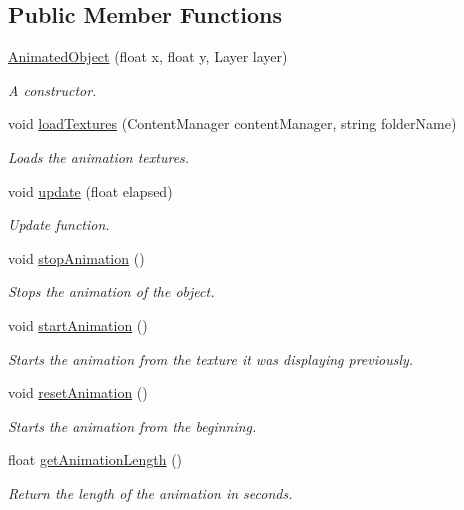 \subsection*{Public Member Functions}
\begin{DoxyCompactItemize}
\item 
\hyperlink{classwp__engine_1_1_animated_object_a43b6d15d770384cafc4546b447a63303}{Animated\-Object} (float x, float y, Layer layer)
\begin{DoxyCompactList}\small\item\em A constructor. \end{DoxyCompactList}\item 
void \hyperlink{classwp__engine_1_1_animated_object_a4d244865b8e26ffbbd9f9f8658ff9d6b}{load\-Textures} (Content\-Manager content\-Manager, string folder\-Name)
\begin{DoxyCompactList}\small\item\em Loads the animation textures. \end{DoxyCompactList}\item 
void \hyperlink{classwp__engine_1_1_animated_object_a5cf1995b0821dcb47fd878adcd996257}{update} (float elapsed)
\begin{DoxyCompactList}\small\item\em Update function. \end{DoxyCompactList}\item 
void \hyperlink{classwp__engine_1_1_animated_object_ab14a6e72ab2ff3a3c3ffbbfc2aa152f8}{stop\-Animation} ()
\begin{DoxyCompactList}\small\item\em Stops the animation of the object. \end{DoxyCompactList}\item 
void \hyperlink{classwp__engine_1_1_animated_object_af25e7e5021799779dae6a46c23458f48}{start\-Animation} ()
\begin{DoxyCompactList}\small\item\em Starts the animation from the texture it was displaying previously. \end{DoxyCompactList}\item 
void \hyperlink{classwp__engine_1_1_animated_object_ac55ab9141a73b2e220934a01e36083c8}{reset\-Animation} ()
\begin{DoxyCompactList}\small\item\em Starts the animation from the beginning. \end{DoxyCompactList}\item 
float \hyperlink{classwp__engine_1_1_animated_object_aa14b0987cad18b3268fb3a1601d839a2}{get\-Animation\-Length} ()
\begin{DoxyCompactList}\small\item\em Return the length of the animation in seconds. \end{DoxyCompactList}\end{DoxyCompactItemize}
